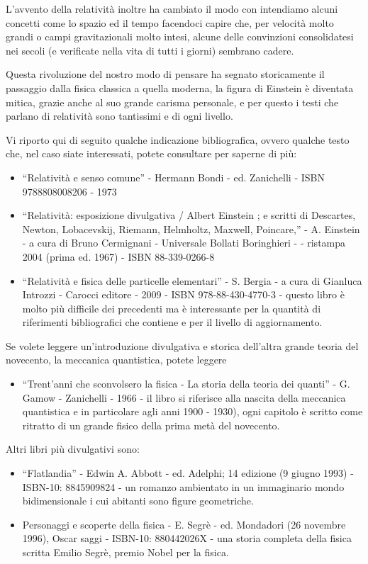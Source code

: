 L'avvento della relatività inoltre ha cambiato il modo con intendiamo alcuni concetti come lo spazio ed il tempo
facendoci capire che, per velocità molto grandi o campi gravitazionali molto intesi, alcune delle convinzioni consolidatesi nei 
secoli (e verificate nella vita di tutti i giorni) sembrano cadere.

Questa rivoluzione del nostro modo di pensare ha segnato storicamente il passaggio dalla fisica classica a quella moderna, 
la figura di Einstein è diventata mitica, grazie anche al suo grande carisma personale, e per questo i testi
che parlano di relatività sono tantissimi e di ogni livello.

Vi riporto qui di seguito qualche indicazione bibliografica, ovvero qualche testo che, nel caso siate interessati, 
potete consultare per saperne di più:
\begin{itemize}
 \item ``Relatività e senso comune'' - Hermann Bondi - ed. Zanichelli - ISBN 9788808008206 - 1973
 \item ``Relatività: esposizione divulgativa / Albert Einstein ; e scritti di Descartes, Newton, Lobacevskij, Riemann, Helmholtz, Maxwell, Poincare,''
  - A. Einstein - a cura di Bruno Cermignani - Universale Bollati Boringhieri - 
  - ristampa 2004 (prima ed. 1967)  - ISBN 88-339-0266-8
 \item ``Relatività e fisica delle particelle elementari'' - S. Bergia - a cura di Gianluca Introzzi - Carocci editore
  - 2009  - ISBN 978-88-430-4770-3 - questo libro è molto più difficile dei precedenti ma è interessante per la quantità di riferimenti 
 bibliografici che contiene e per il livello di aggiornamento.
\end{itemize}

Se volete leggere un'introduzione divulgativa e storica dell'altra grande teoria del novecento, la meccanica quantistica, potete leggere

\begin{itemize}
 \item ``Trent'anni che sconvolsero la fisica - La storia della teoria dei quanti'' - G. Gamow - Zanichelli - 1966 - il libro si riferisce 
 alla nascita della meccanica quantistica e in particolare agli anni 1900 - 1930), ogni capitolo è  scritto come ritratto di un 
 grande fisico della prima metà del novecento.
\end{itemize}

Altri libri più divulgativi sono:
\begin{itemize}
 \item ``Flatlandia'' - Edwin A. Abbott - ed. Adelphi; 14 edizione (9 giugno 1993) - ISBN-10: 8845909824 - un romanzo ambientato in un immaginario mondo bidimensionale i cui abitanti sono figure geometriche.
 \item  Personaggi e scoperte della fisica - E. Segrè - ed. Mondadori (26 novembre 1996), Oscar saggi - ISBN-10: 880442026X - una storia completa della fisica scritta Emilio Segrè, premio Nobel per la fisica.
\end{itemize}
